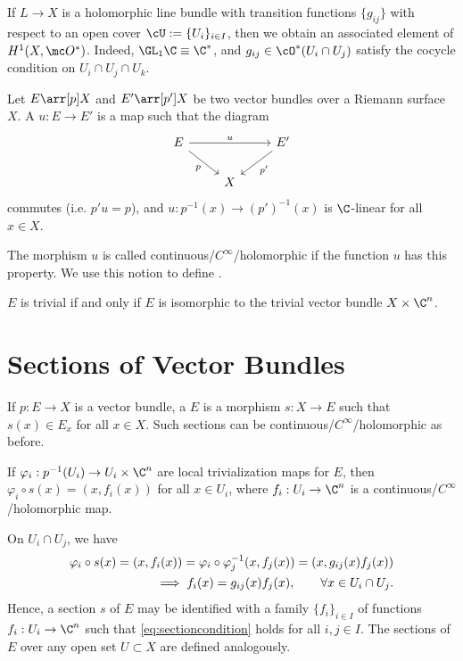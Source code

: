 \documentclass[11pt]{report}
\begin{document}
\begin{rmk}
    If $L \to X$ is a holomorphic line bundle with transition functions $\{g_{ij}\}$ with respect to an open cover $\cU := \{U_i\}_{i\in I}$, then we obtain an associated element of $H^1(X,\mc O^*)$. Indeed, $\GL_1\C \equiv \C^*$, and $g_{ij} \in \cO^*(U_i \cap U_j)$ satisfy the cocycle condition on $U_i \cap U_j \cap U_k$.
\end{rmk}

\begin{defn}
    Let $E \arr[p]X$ and $E' \arr[p']X$ be two vector bundles over a Riemann surface $X$. A  $u:E \to E'$ is a map such that the diagram
\[\begin{tikzcd}[ampersand replacement=\&]
	E \&\& {E'} \\
	\& X
	\arrow["u", from=1-1, to=1-3]
	\arrow["p"', from=1-1, to=2-2]
	\arrow["{p'}", from=1-3, to=2-2]
\end{tikzcd}\]
commutes (i.e. $p'u =p$), and $u:p^{-1}(x) \to (p')^{-1}(x)$ is $\C$-linear for all $x \in X$.

The morphism $u$ is called continuous/$C^\infty$/holomorphic if the function $u$ has this property. We use this notion to define . 
\end{defn}

\begin{ex}
    $E$ is trivial if and only if $E$ is isomorphic to the trivial vector bundle $X \times \C^n$.
\end{ex}

\section{Sections of Vector Bundles}

\begin{defn}
    If $p:E \to X$ is a vector bundle, a  $E$ is a morphism $s:X \to E$ such that $s(x) \in E_x$ for all $x \in X$. Such sections can be continuous/$C^\infty$/holomorphic as before.
\end{defn}

If $\varphi_i: p^{-1}(U_i) \to U_i \times \C^n$ are local trivialization maps for $E$, then $\varphi_i \circ s(x)=(x,f_i(x))$ for all $x \in U_i$, where $f_i :U_i \to \C^n$ is a continuous/$C^\infty$/holomorphic map.

On $U_i \cap U_j$, we have 
\begin{align}
    \varphi_i \circ s(x) = (x,f_i(x))=\varphi_i \circ \varphi_j^{-1}(x,f_j(x))=(x,g_{ij}(x)f_j(x)) \notag
    \\ \implies f_i(x)=g_{ij}(x)f_j(x), \qquad \forall x \in U_i \cap U_j. \label{eq:sectioncondition}
\end{align}
Hence, a section $s$ of $E$ may be identified with a family $\{f_i\}_{i \in I}$ of functions $f_i:U_i \to \C^n$ such that \eqref{eq:sectioncondition} holds for all $i,j \in I$. The sections of $E$ over any open set $U \subset X$ are defined analogously.
\end{document}
